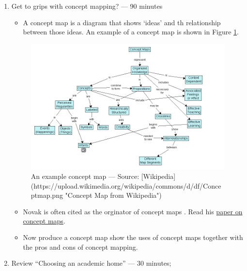 \documentclass[]{book}
\providecommand{\tightlist}{%
  \setlength{\itemsep}{0pt}\setlength{\parskip}{0pt}}
\theoremstyle{definition}
\theoremstyle{definition}
\theoremstyle{definition}
\theoremstyle{remark}
\begin{document}
\begin{enumerate}
\def\labelenumi{\arabic{enumi}.}
\item
  Get to grips with concept mapping? --- 90 minutes

  \begin{itemize}
  \tightlist
  \item
    A concept map is a diagram that shows `ideas' and th relationship
    between those ideas. An example of a concept map is shown in Figure
    \ref{fig:exampleCM}.
  \end{itemize}

  \begin{figure}
   \includegraphics[width=12.33in]{images/ConceptMap} \caption{An example concept map --- Source: [Wikipedia](https://upload.wikimedia.org/wikipedia/commons/d/df/Conceptmap.png "Concept Map from Wikipedia")}\label{fig:exampleCM}
   \end{figure}

  \begin{itemize}
  \item
    Novak is often cited as the orginator of concept maps \autocite[for
    example,][]{novak_2006_originsconceptmapping}. Read his
    \href{https://msu.edu/~luckie/ctools/}{paper on concept maps}.
  \item
    Now produce a concept map show the uses of concept maps together
    with the pros and cons of concept mapping.
  \end{itemize}
\item
  Review ``Choosing an academic home''
  \autocite{huff_2009_designingresearchpublication} --- 30 minutes;
\end{enumerate}
\end{document}
